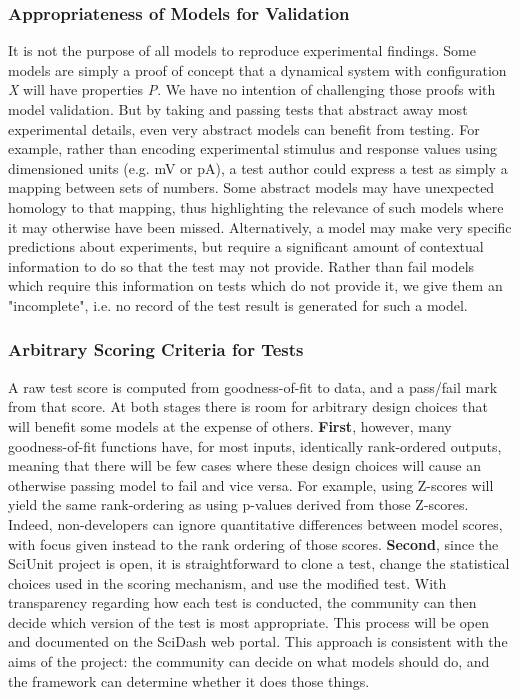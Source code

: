 \documentclass[a4paper,12pt]{article}
\begin{document}
\subsubsection{Appropriateness of Models for Validation}
It is not the purpose of all models to reproduce experimental findings.  Some models are simply a proof of concept that a dynamical system with configuration \textit{X} will have properties \textit{P}.  We have no intention of challenging those proofs with model validation. But by taking and passing tests that abstract away most experimental details, even very abstract models can benefit from testing.  For example, rather than encoding experimental stimulus and response values using dimensioned units (e.g. mV or pA), a test author could express a test as simply a mapping between sets of numbers.  Some abstract models may have unexpected homology to that mapping, thus highlighting the relevance of such models where it may otherwise have been missed.  Alternatively, a model may make very specific predictions about experiments, but require a significant amount of contextual information to do so that the test may not provide.  Rather than fail models which require this information on tests which do not provide it, we give them an "incomplete", i.e. no record of the test result is generated for such a model.  

\subsubsection{Arbitrary Scoring Criteria for Tests}
A raw test score is computed from goodness-of-fit to data, and a pass/fail mark from that score.  At both stages there is room for arbitrary design choices that will benefit some models at the expense of others.  \textbf{First}, however, many goodness-of-fit functions have, for most inputs, identically rank-ordered outputs, meaning that there will be few cases where these design choices will cause an otherwise passing model to fail and vice versa.  For example, using Z-scores will yield the same rank-ordering as using p-values derived from those Z-scores.  Indeed, non-developers can ignore quantitative differences between model scores, with focus given instead to the rank ordering of those scores. \textbf{Second}, since the SciUnit project is open, it is straightforward to clone a test, change the statistical choices used in the scoring mechanism, and use the modified test.  With transparency regarding how each test is conducted, the community can then decide which version of the test is most appropriate.  This process will be open and documented on the SciDash web portal.  This approach is consistent with the aims of the project: the community can decide on what models should do, and the framework can determine whether it does those things. 
\end{document}
